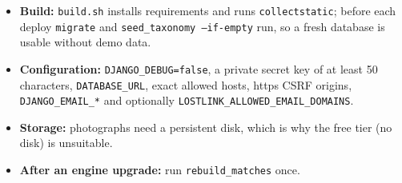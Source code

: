 \documentclass[12pt,a4paper,oneside]{report}
\newcommand{\code}[1]{\texttt{#1}}
\begin{document}
\begin{itemize}
  \item \textbf{Build:} \code{build.sh} installs requirements and runs \code{collectstatic}; before each deploy \code{migrate} and \code{seed\_taxonomy --if-empty} run, so a fresh database is usable without demo data.
  \item \textbf{Configuration:} \code{DJANGO\_DEBUG=false}, a private secret key of at least 50 characters, \code{DATABASE\_URL}, exact allowed hosts, https CSRF origins, \code{DJANGO\_EMAIL\_*} and optionally \code{LOSTLINK\_ALLOWED\_EMAIL\_DOMAINS}.
  \item \textbf{Storage:} photographs need a persistent disk, which is why the free tier (no disk) is unsuitable.
  \item \textbf{After an engine upgrade:} run \code{rebuild\_matches} once.
\end{itemize}
\end{document}
